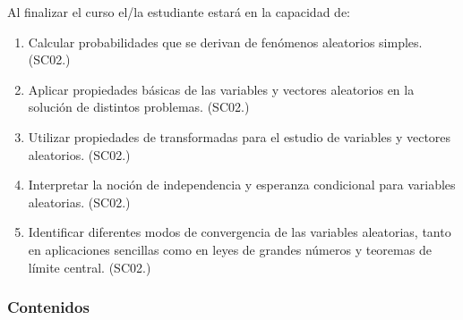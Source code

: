 \begin{refsection}
Al finalizar el curso el/la estudiante estará en la capacidad de:

\begin{enumerate}
\item Calcular probabilidades que se derivan de fenómenos aleatorios simples. (SC02.)
\item Aplicar propiedades básicas de las variables y vectores aleatorios en la solución de distintos problemas. (SC02.)
\item Utilizar propiedades de transformadas para el estudio de variables y vectores aleatorios. (SC02.)
\item Interpretar la noción de independencia y esperanza condicional para variables aleatorias. (SC02.)
\item Identificar diferentes modos de convergencia de las variables aleatorias, tanto en aplicaciones sencillas como en leyes de grandes números y teoremas de límite central. (SC02.)
\end{enumerate}

\subsubsection*{Contenidos}


\end{refsection}
